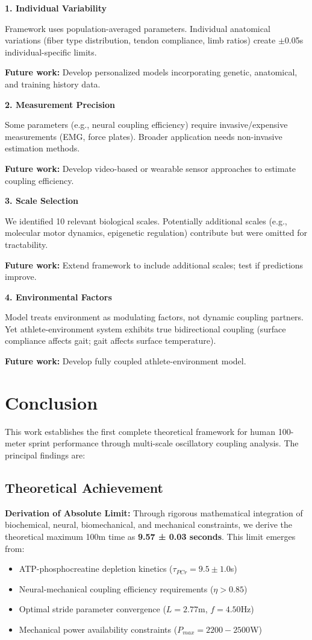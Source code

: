 \documentclass[10pt]{article}
\begin{document}
\textbf{1. Individual Variability}

Framework uses population-averaged parameters. Individual anatomical variations (fiber type distribution, tendon compliance, limb ratios) create $\pm$0.05s individual-specific limits.

\textbf{Future work:} Develop personalized models incorporating genetic, anatomical, and training history data.

\textbf{2. Measurement Precision}

Some parameters (e.g., neural coupling efficiency) require invasive/expensive measurements (EMG, force plates). Broader application needs non-invasive estimation methods.

\textbf{Future work:} Develop video-based or wearable sensor approaches to estimate coupling efficiency.

\textbf{3. Scale Selection}

We identified 10 relevant biological scales. Potentially additional scales (e.g., molecular motor dynamics, epigenetic regulation) contribute but were omitted for tractability.

\textbf{Future work:} Extend framework to include additional scales; test if predictions improve.

\textbf{4. Environmental Factors}

Model treats environment as modulating factors, not dynamic coupling partners. Yet athlete-environment system exhibits true bidirectional coupling (surface compliance affects gait; gait affects surface temperature).

\textbf{Future work:} Develop fully coupled athlete-environment model.


\section{Conclusion}

This work establishes the first complete theoretical framework for human 100-meter sprint performance through multi-scale oscillatory coupling analysis. The principal findings are:

\subsection{Theoretical Achievement}

\textbf{Derivation of Absolute Limit:} Through rigorous mathematical integration of biochemical, neural, biomechanical, and mechanical constraints, we derive the theoretical maximum 100m time as \textbf{9.57 ± 0.03 seconds}. This limit emerges from:
\begin{itemize}
\item ATP-phosphocreatine depletion kinetics ($\tau_{PCr} = 9.5 \pm 1.0$s)
\item Neural-mechanical coupling efficiency requirements ($\eta > 0.85$)
\item Optimal stride parameter convergence ($L = 2.77$m, $f = 4.50$Hz)
\item Mechanical power availability constraints ($P_{max} = 2200-2500$W)
\end{itemize}
\end{document}
